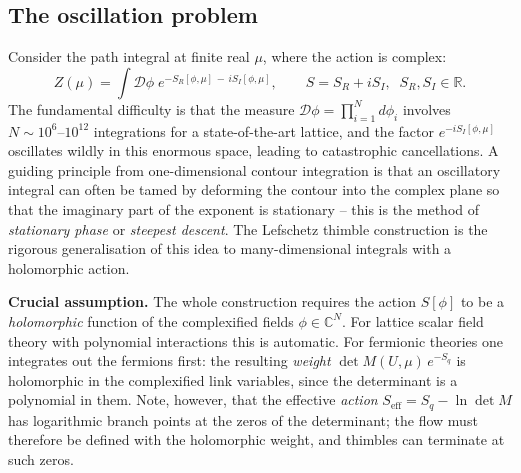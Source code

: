 \documentclass[11pt]{article}
\newcommand{\sidefact}[1]{\marginnote{\footnotesize\textcolor{green!50!black}{#1}}}
\theoremstyle{definition}
\begin{document}
\subsection{The oscillation problem}
\sidefact{This is a precise version of the sign problem: the
integrand oscillates so rapidly that the Monte Carlo estimate of the integral
has an exponentially small signal-to-noise ratio in the volume.}
Consider the path integral at finite real $\mu$, where the action is complex:
\begin{equation}
  Z(\mu) = \int \mathcal{D}\phi\;
           e^{-S_R[\phi,\mu]\,-\,i S_I[\phi,\mu]} ,
  \qquad S = S_R + i S_I, \;\; S_R, S_I \in \mathbb{R} .
\end{equation}
The fundamental difficulty is that the measure 
$\mathcal{D}\phi = \prod_{i=1}^{N} d\phi_i$ involves $N \sim 10^{6}\text{--}10^{12}$
integrations for a state-of-the-art lattice, and the factor
$e^{-iS_I[\phi,\mu]}$ oscillates wildly in this enormous space, leading to
catastrophic cancellations.
A guiding principle from one-dimensional contour integration is that an
oscillatory integral can often be tamed by deforming the contour into the
complex plane so that the imaginary part of the exponent is stationary --
this is the method of \emph{stationary phase} or \emph{steepest descent}.
The Lefschetz thimble construction is the rigorous generalisation of this
idea to many-dimensional integrals with a holomorphic action.


\textbf{Crucial assumption.} The whole construction requires the action
$S[\phi]$ to be a \emph{holomorphic} function of the complexified fields
$\phi \in \mathbb{C}^N$. For lattice scalar field theory with polynomial
interactions this is automatic. For fermionic theories one integrates out
the fermions first: the resulting \emph{weight} $\det M(U,\mu)\,e^{-S_q}$
is holomorphic in the complexified link variables, since the determinant is
a polynomial in them. Note, however, that the effective \emph{action}
$S_{\text{eff}} = S_q - \ln\det M$ has logarithmic branch points at the
zeros of the determinant; the flow must therefore be defined with the
holomorphic weight, and thimbles can terminate at such zeros.


\end{document}
